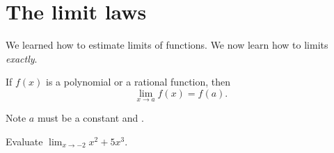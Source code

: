 \documentclass[../main.tex]{subfiles}
\begin{document}
 \section{The limit laws}
We learned how to estimate limits of functions. We now learn how to  limits \emph{exactly}.


\begin{mdframed}[style=simple-compact]
  If \(f(x)\) is a polynomial or a rational function, then
  \[
    \lim_{x \to a} f(x) = f(a).
  \]
\end{mdframed}
\faExclamationTriangle{} Note \(a\) must be a constant \underline{\hspace{6cm}} and \underline{\hspace{2in}}.


\begin{example}
  Evaluate \(\lim_{x \to -2} x^{2} + 5 x^{3}\).

\end{example}

\end{document}
